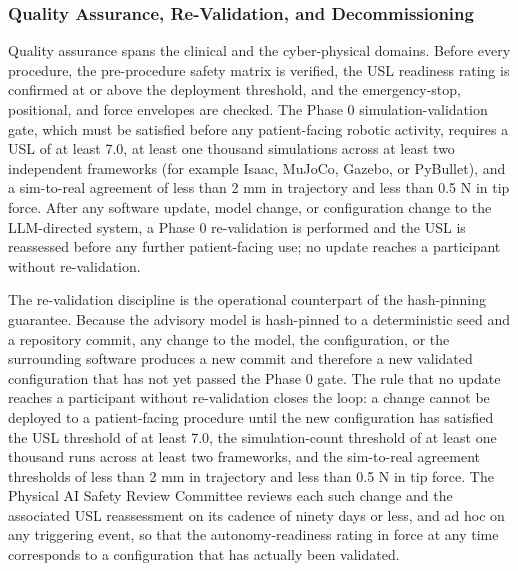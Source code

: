 \subsubsection{Quality Assurance, Re-Validation, and Decommissioning}

Quality assurance spans the clinical and the cyber-physical domains. Before every
procedure, the pre-procedure safety matrix is verified, the USL readiness rating is
confirmed at or above the deployment threshold, and the emergency-stop, positional,
and force envelopes are checked. The Phase 0 simulation-validation gate, which must
be satisfied before any patient-facing robotic activity, requires a USL of at least
7.0, at least one thousand simulations across at least two independent frameworks
(for example Isaac, MuJoCo, Gazebo, or PyBullet), and a sim-to-real agreement of
less than 2 mm in trajectory and less than 0.5 N in tip force. After any software
update, model change, or configuration change to the LLM-directed system, a Phase 0
re-validation is performed and the USL is reassessed before any further
patient-facing use; no update reaches a participant without re-validation.

The re-validation discipline is the operational counterpart of the hash-pinning
guarantee. Because the advisory model is hash-pinned to a deterministic seed and a
repository commit, any change to the model, the configuration, or the surrounding
software produces a new commit and therefore a new validated configuration that has
not yet passed the Phase 0 gate. The rule that no update reaches a participant
without re-validation closes the loop: a change cannot be deployed to a patient-facing
procedure until the new configuration has satisfied the USL threshold of at least
7.0, the simulation-count threshold of at least one thousand runs across at least two
frameworks, and the sim-to-real agreement thresholds of less than 2 mm in trajectory
and less than 0.5 N in tip force. The Physical AI Safety Review Committee reviews each
such change and the associated USL reassessment on its cadence of ninety days or
less, and ad hoc on any triggering event, so that the autonomy-readiness rating in
force at any time corresponds to a configuration that has actually been validated.

